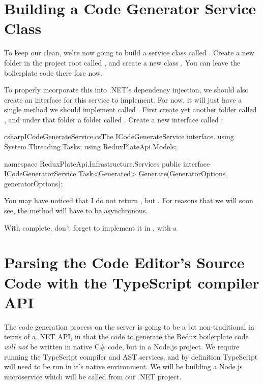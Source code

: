 \documentclass[paper=6in:9in,pagesize=pdftex,headinclude=on,footinclude=on,12pt,twoside]{scrbook}
\begin{document}
\section{Building a Code Generator Service Class}

To keep our  clean, we're now going to build a service class called . Create a new folder in the project root called , and create a new class . You can leave the boilerplate code there fore now.

To properly incorporate this into .NET's dependency injection, we should also create an interface for this service to implement. For now, it will just have a single method we should implement called . First create yet another folder called , and under that folder a folder called . Create a new interface called :

\begin{codeInput}{csharp}{ICodeGenerateService.cs}{The ICodeGenerateService interface.}
using System.Threading.Tasks;
using ReduxPlateApi.Models;

namespace ReduxPlateApi.Infrastructure.Services
{
    public interface ICodeGeneratorService
    {
        Task<Generated> Generate(GeneratorOptions generatorOptions);
    }
}
\end{codeInput}

You may have noticed that I do not return , but . For reasons that we will soon see, the  method will have to be asynchronous. 

With  complete, don't forget to implement it in , with a 

\section{Parsing the Code Editor's Source Code with the TypeScript compiler API}


The code generation process on the server is going to be a bit non-traditional in terms of a .NET API, in that the code to generate the Redux boilerplate code \textit{will not} be written in native C\# code, but in a Node.js project. We require running the TypeScript compiler and AST services, and by definition TypeScript will need to be run in it's native environment. We will be building a Node.js microservice which will be called from our .NET project.
\end{document}
